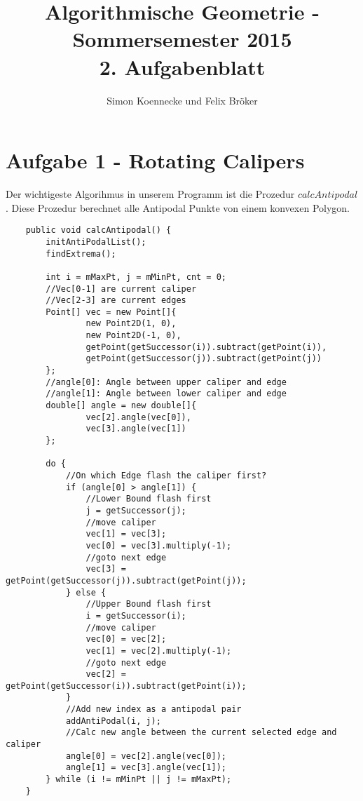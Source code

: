 \documentclass[a4paper]{article}
\begin{document}
\title{Algorithmische Geometrie - Sommersemester 2015\\
       2. Aufgabenblatt }
\author{Simon Koennecke und Felix Bröker}
\date{}
\maketitle

\section*{Aufgabe 1 - Rotating Calipers}

Der wichtigeste Algorihmus in unserem Programm ist die Prozedur $calcAntipodal$. Diese Prozedur berechnet alle Antipodal Punkte von einem konvexen Polygon.

\begin{lstlisting}
    public void calcAntipodal() {
        initAntiPodalList();
        findExtrema();

        int i = mMaxPt, j = mMinPt, cnt = 0;
        //Vec[0-1] are current caliper
        //Vec[2-3] are current edges
        Point[] vec = new Point[]{
                new Point2D(1, 0),
                new Point2D(-1, 0),
                getPoint(getSuccessor(i)).subtract(getPoint(i)),
                getPoint(getSuccessor(j)).subtract(getPoint(j))
        };
        //angle[0]: Angle between upper caliper and edge
		//angle[1]: Angle between lower caliper and edge
        double[] angle = new double[]{
                vec[2].angle(vec[0]),
                vec[3].angle(vec[1])
        };

        do {
            //On which Edge flash the caliper first?
            if (angle[0] > angle[1]) {
                //Lower Bound flash first
                j = getSuccessor(j);
                //move caliper
                vec[1] = vec[3];
                vec[0] = vec[3].multiply(-1);
                //goto next edge
                vec[3] = getPoint(getSuccessor(j)).subtract(getPoint(j));
            } else {
                //Upper Bound flash first
                i = getSuccessor(i);
                //move caliper
                vec[0] = vec[2];
                vec[1] = vec[2].multiply(-1);
                //goto next edge
                vec[2] = getPoint(getSuccessor(i)).subtract(getPoint(i));
            }
            //Add new index as a antipodal pair
            addAntiPodal(i, j);
			//Calc new angle between the current selected edge and caliper
            angle[0] = vec[2].angle(vec[0]);
            angle[1] = vec[3].angle(vec[1]);
        } while (i != mMinPt || j != mMaxPt);
    }

\end{lstlisting}
\end{document}
